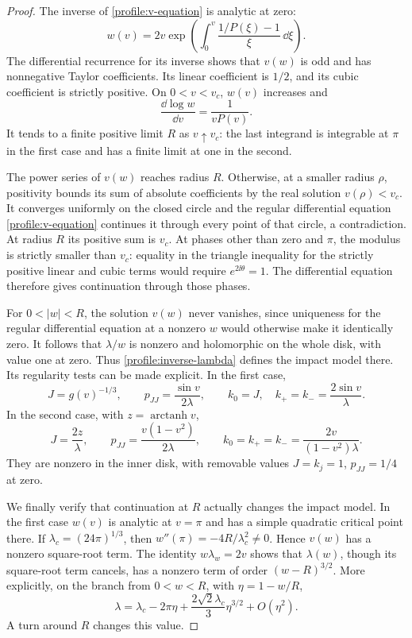 \begin{proof}
The inverse of \eqref{profile:v-equation} is analytic at zero:
\[
 w(v)=2v\exp\left(\int_0^v
                    \frac{1/P(\xi)-1}{\xi}\,\dd\xi\right).
\]
The differential recurrence for its inverse shows that \(v(w)\) is
odd and has nonnegative Taylor coefficients. Its linear coefficient
is \(1/2\), and its cubic coefficient is strictly positive. On
\(0<v<v_c\), \(w(v)\) increases and
\[
 \frac{\dd\log w}{\dd v}=\frac{1}{vP(v)}.
\]
It tends to a finite positive limit \(R\) as \(v\uparrow v_c\):
the last integrand is integrable at \(\pi\) in the first case and
has a finite limit at one in the second.

The power series of \(v(w)\) reaches radius \(R\). Otherwise, at
a smaller radius \(\rho\), positivity bounds its sum of absolute
coefficients by the real solution \(v(\rho)<v_c\). It converges
uniformly on the closed circle and the regular differential equation
\eqref{profile:v-equation} continues it through every point of that
circle, a contradiction. At radius \(R\) its positive sum is
\(v_c\). At phases other than zero and \(\pi\), the modulus is
strictly smaller than \(v_c\): equality in the triangle inequality
for the strictly positive linear and cubic terms would require
\(e^{2\ii\theta}=1\). The differential equation therefore gives
continuation through those phases.

For \(0<|w|<R\), the solution \(v(w)\) never vanishes, since
uniqueness for the regular differential equation at a nonzero \(w\)
would otherwise make it identically zero. It follows that
\(\lambda/w\) is nonzero and holomorphic on the whole disk, with
value one at zero. Thus \eqref{profile:inverse-lambda} defines the
impact model there. Its regularity tests can be made explicit. In
the first case,
\[
 J=g(v)^{-1/3},\qquad p_{JJ}=\frac{\sin v}{2\lambda},\qquad
 k_0=J,\quad k_+=k_-=\frac{2\sin v}{\lambda}.
\]
In the second case, with \(z=\operatorname{arctanh}v\),
\[
 J=\frac{2z}{\lambda},\qquad
 p_{JJ}=\frac{v(1-v^2)}{2\lambda},\qquad
 k_0=k_+=k_-=\frac{2v}{(1-v^2)\lambda}.
\]
They are nonzero in the inner disk, with removable values
\(J=k_j=1\), \(p_{JJ}=1/4\) at zero.

We finally verify that continuation at \(R\) actually changes the
impact model. In the first case \(w(v)\) is analytic at \(v=\pi\)
and has a simple quadratic critical point there. If
\(\lambda_c=(24\pi)^{1/3}\), then
\(w''(\pi)=-4R/\lambda_c^2\ne0\). Hence \(v(w)\) has a
nonzero square-root term. The identity \(w\lambda_w=2v\) shows
that \(\lambda(w)\), though its square-root term cancels, has a
nonzero term of order \((w-R)^{3/2}\). More explicitly, on the
branch from \(0<w<R\), with \(\eta=1-w/R\),
\[
 \lambda=\lambda_c-2\pi\eta
        +\frac{2\sqrt2\lambda_c}{3}\eta^{3/2}+O(\eta^2).
\]
A turn around \(R\) changes this value.


\end{proof}
